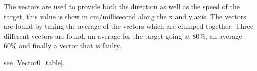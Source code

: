 % 

The vectors are used to provide both the direction as well as the speed of the
target, this value is show in cm/millisecond along the x and y axis. The
vectors are found by taking the average of the vectors which are clumped
together. Three different vectors are found, an average for the target going at
80\%, an average 60\% and finally a vector that is faulty.

 see \autoref{Vector0_table}. 

